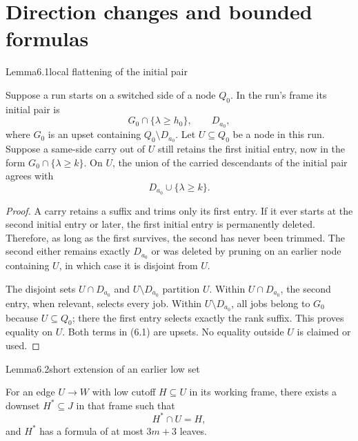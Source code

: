 \section{Direction changes and bounded formulas}

\begin{numbered}{Lemma}{6.1}{local flattening of the initial pair}

Suppose a run starts on a switched side of a node \(Q_0\). In the run's frame its initial pair is \[
G_0\cap\{\lambda\geq h_0\},\qquad D_{a_0},
\] where \(G_0\) is an upset containing \(Q_0\setminus D_{a_0}\). Let \(U\subseteq Q_0\) be a node in this run. Suppose a same-side carry out of \(U\) still retains the first initial entry, now in the form \(G_0\cap\{\lambda\geq k\}\). On \(U\), the union of the carried descendants of the initial pair agrees with \[
D_{a_0}\cup\{\lambda\geq k\}.
\tag{6.1}
\]

\end{numbered}

\begin{proof}
A carry retains a suffix and trims only its first entry. If it ever starts at the second initial entry or later, the first initial entry is permanently deleted. Therefore, as long as the first survives, the second has never been trimmed. The second either remains exactly \(D_{a_0}\) or was deleted by pruning on an earlier node containing \(U\), in which case it is disjoint from \(U\).

The disjoint sets \(U\cap D_{a_0}\) and \(U\setminus D_{a_0}\) partition \(U\). Within \(U\cap D_{a_0}\), the second entry, when relevant, selects every job. Within \(U\setminus D_{a_0}\), all jobs belong to \(G_0\) because \(U\subseteq Q_0\); there the first entry selects exactly the rank suffix. This proves equality on \(U\). Both terms in (6.1) are upsets. No equality outside \(U\) is claimed or used.
\end{proof}

\begin{numbered}{Lemma}{6.2}{short extension of an earlier low set}

For an edge \(U\to W\) with low cutoff \(H\subseteq U\) in its working frame, there exists a downset \(H^*\subseteq J\) in that frame such that \[
H^*\cap U=H,
\tag{6.2}
\] and \(H^*\) has a formula of at most \(3m+3\) leaves.

\end{numbered}

